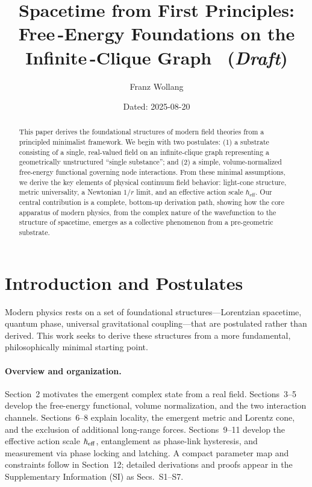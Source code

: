 \documentclass[11pt]{article}
\title{Spacetime from First Principles: Free\mbox{\,-}Energy Foundations on the Infinite\mbox{\,-}Clique Graph \, (\textit{Draft})}
\author[ ]{Franz Wollang}
\affil[ ]{\small Independent Researcher}
\date{\small Dated: 2025-08-20}
\begin{document}
\maketitle

\begin{center}
\setlength{\fboxsep}{8pt}%
\end{center}
\vspace{1em}

\begin{abstract}
This paper derives the foundational structures of modern field theories from a principled minimalist framework. We begin with two postulates: (1) a substrate consisting of a single, real-valued field on an infinite-clique graph representing a geometrically unstructured ``single substance''; and (2) a simple, volume-normalized free-energy functional governing node interactions. From these minimal assumptions, we derive the key elements of physical continuum field behavior: light-cone structure, metric universality, a Newtonian $1/r$ limit, and an effective action scale $\hbar_{\mathrm{eff}}$. Our central contribution is a complete, bottom-up derivation path, showing how the core apparatus of modern physics, from the complex nature of the wavefunction to the structure of spacetime, emerges as a collective phenomenon from a pre-geometric substrate.
\end{abstract}

\section{Introduction and Postulates}

Modern physics rests on a set of foundational structures—Lorentzian spacetime, quantum phase, universal gravitational coupling—that are postulated rather than derived. This work seeks to derive these structures from a more fundamental, philosophically minimal starting point.

\paragraph{Overview and organization.} Section~2 motivates the emergent complex state from a real field. Sections~3--5 develop the free-energy functional, volume normalization, and the two interaction channels. Sections~6--8 explain locality, the emergent metric and Lorentz cone, and the exclusion of additional long-range forces. Sections~9--11 develop the effective action scale $\hbar_{\rm eff}$, entanglement as phase-link hysteresis, and measurement via phase locking and latching. A compact parameter map and constraints follow in Section~12; detailed derivations and proofs appear in the Supplementary Information (SI) as Secs.~S1--S7.
\end{document}
